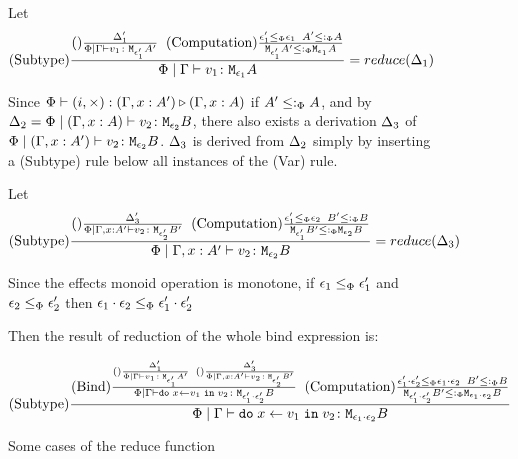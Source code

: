 \documentclass{Report}
\begin{document}
\begin{figure}
\begin{framed}
    Let \begin{equation}
        (\text{Subtype}) \frac{
            (\text{}) \frac{\Delta'_1}{\Phi\mid\Gamma \vdash v_1 \colon \texttt{M}_{\epsilon'_1}{A'}}
        \;\;
        (\text{Computation}) \frac{ \epsilon_1'\leq_{\Phi} \epsilon_1\;\; A' \leq:_\Phi A }{\texttt{M}_{\epsilon_1'}{ A' }\leq:_\Phi\texttt{M}_{\epsilon_1}{A}}
        }{
            \Phi\mid\Gamma \vdash v_1 \colon \texttt{M}_{\epsilon_1}{A}
        } = reduce(\Delta_1)
    \end{equation}

    Since $\Phi\vdash (i,\times) : (\Gamma, x: A') \triangleright (\Gamma, x: A)$ if $A' \leq:_\Phi A$, and by $\Delta_2 = \Phi\mid(\Gamma, x: A) \vdash v_2 \colon \texttt{M}_{\epsilon_2}{B}$, there also exists a derivation $\Delta_3$ of $\Phi\mid(\Gamma, x: A') \vdash v_2 \colon \texttt{M}_{\epsilon_2}{B}$. $\Delta_3$ is derived from $\Delta_2$ simply by inserting a (Subtype) rule below all instances of the (Var) rule.

    Let \begin{equation}
        (\text{Subtype}) \frac{
            (\text{}) \frac{\Delta'_3}{\Phi\mid\Gamma, x: A' \vdash v_2 \colon \texttt{M}_{\epsilon'_2}{B'}}
        \;\;
        (\text{Computation}) \frac{ \epsilon_1'\leq_{\Phi} \epsilon_2\;\; B' \leq:_\Phi B }{\texttt{M}_{\epsilon_1'}{ B' }\leq:_\Phi\texttt{M}_{\epsilon_2}{B}}
        }{
            \Phi\mid\Gamma, x: A' \vdash v_2 \colon \texttt{M}_{\epsilon_2}{B}
        } = reduce(\Delta_3)
    \end{equation}
    

    Since the effects monoid operation is monotone, if $\epsilon_1\leq_{\Phi}\epsilon_1'$ and $\epsilon_2\leq_{\Phi}\epsilon_2'$ then $\epsilon_1\cdot\epsilon_2 \leq_{\Phi} \epsilon_1'\cdot\epsilon_2'$
    


    Then the result of reduction of the whole bind expression is:


    \begin{equation}
        (\text{Subtype}) \frac{
            (\text{Bind}) \frac{
                (\text{}) \frac{
                    \Delta'_1
                }{
                    \Phi\mid\Gamma \vdash v_1 \colon \texttt{M}_{\epsilon_1'}{A'}
                }
                \;\;
                (\text{}) \frac{
                    \Delta'_3
                }{
                    \Phi\mid\Gamma, x: A' \vdash v_2 \colon \texttt{M}_{\epsilon_2'}{B'}
                }
            }{
            \Phi\mid\Gamma \vdash \texttt{do}\; x \leftarrow v_1 \;\texttt{in}\; v_2 \colon \texttt{M}_{\epsilon_1'\cdot\epsilon_2'}{B}
            }
            \;\;
            (\text{Computation}) \frac{ \epsilon_1'\cdot\epsilon_2'\leq_{\Phi} \epsilon_1\cdot\epsilon_2\;\; B' \leq:_\Phi B }{\texttt{M}_{\epsilon_1'\cdot\epsilon_2'}{ B' }\leq:_\Phi\texttt{M}_{\epsilon_1\cdot\epsilon_2}{B}}
        }{
            \Phi\mid\Gamma \vdash \texttt{do}\; x \leftarrow v_1 \;\texttt{in}\; v_2 \colon \texttt{M}_{\epsilon_1\cdot\epsilon_2}{B}
        }
    \end{equation}
    \end{framed}

    \caption{Some cases of the reduce function}
    \label{ReduceFunctionCases}
\end{figure}
\end{document}
